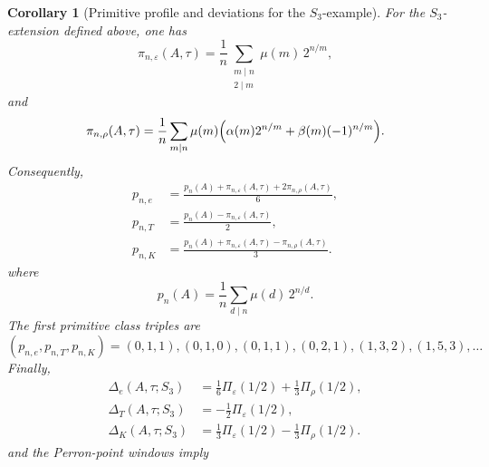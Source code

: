 \documentclass[11pt,a4paper]{amsart}
\theoremstyle{plain}
\newtheorem{corollary}[theorem]{Corollary}
\theoremstyle{definition}
\theoremstyle{remark}
\begin{document}
\begin{corollary}[Primitive profile and deviations for the
  \(S_3\)-example]
  \label{cor:s3-example-profile}
  For the \(S_3\)-extension defined above, one has
  \begin{equation}\label{eq:s3-example-primitive-sign-coefficients}
    \pi_{n,\varepsilon}(A,\tau)
    =
    \frac{1}{n}
      \sum_{\substack{m\mid n\\ 2\mid m}}
        \mu(m)\,2^{n/m},
  \end{equation}
  and
  \begin{equation}\label{eq:s3-example-primitive-rho-coefficients}
    \pi_{n,\rho}(A,\tau)
    =
    \frac{1}{n}
      \sum_{m\mid n}
        \mu(m)\Bigl(
          \alpha(m)2^{n/m}+\beta(m)(-1)^{n/m}
        \Bigr).
  \end{equation}
  Consequently,
  \begin{equation}\label{eq:s3-example-primitive-classes}
    \begin{aligned}
      p_{n,e}
      &=\frac{p_n(A)+\pi_{n,\varepsilon}(A,\tau)+2\pi_{n,\rho}(A,\tau)}{6}, \\
      p_{n,T}
      &=\frac{p_n(A)-\pi_{n,\varepsilon}(A,\tau)}{2}, \\
      p_{n,K}
      &=\frac{p_n(A)+\pi_{n,\varepsilon}(A,\tau)-\pi_{n,\rho}(A,\tau)}{3}.
    \end{aligned}
  \end{equation}
  where
  \begin{equation}\label{eq:s3-example-full-two-shift-primitive}
    p_n(A)=\frac{1}{n}\sum_{d\mid n}\mu(d)\,2^{n/d}.
  \end{equation}
  The first primitive class triples are
  \begin{equation}\label{eq:s3-example-primitive-first-terms}
    (p_{n,e},p_{n,T},p_{n,K})
    =(0,1,1),(0,1,0),(0,1,1),(0,2,1),(1,3,2),(1,5,3),\ldots
  \end{equation}
  Finally,
  \begin{equation}\label{eq:s3-example-delta-values}
    \begin{aligned}
      \Delta_e(A,\tau;S_3)
      &=\frac16\Pi_\varepsilon(1/2)+\frac13\Pi_\rho(1/2), \\
      \Delta_T(A,\tau;S_3)
      &=-\frac12\Pi_\varepsilon(1/2), \\
      \Delta_K(A,\tau;S_3)
      &=\frac13\Pi_\varepsilon(1/2)-\frac13\Pi_\rho(1/2).
    \end{aligned}
  \end{equation}
  and the Perron-point windows imply

\end{corollary}
\end{document}
